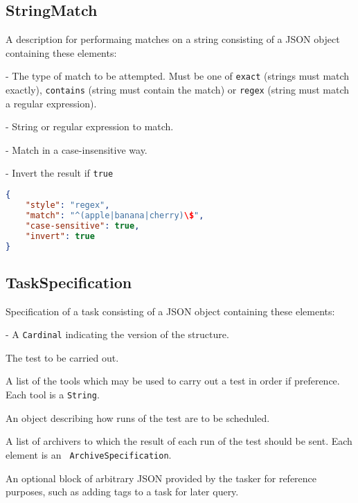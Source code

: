 \documentclass[10pt]{article}
\begin{document}
\subsection{StringMatch}
A description for performaing matches on a string consisting of a JSON
object containing these elements:

 - The type of match to be attempted.  Must
be one of {\tt exact} (strings must match exactly), {\tt contains}
(string must contain the match) or {\tt regex} (string must match a
regular expression).

 - String or regular expression to match.

 - Match in a case-insensitive
way.

 - Invert the result if {\tt true}

\example
\begin{lstlisting}[language=json]
{
    "style": "regex",
    "match": "^(apple|banana|cherry)\$",
    "case-sensitive": true,
    "invert": true
}
\end{lstlisting}



\subsection{TaskSpecification}
Specification of a task consisting of a JSON object containing these
elements:

 - A {\tt Cardinal} indicating the version
of the structure.

 The test to be carried out.

 A list of the tools which may be used to
carry out a test in order if preference.  Each tool is a {\tt String}.

 An object describing how
runs of the test are to be scheduled.

 A list of archivers to which the result of
each run of the test should be sent.  Each element is an {\tt
  ArchiveSpecification}.

 An optional block of arbitrary JSON
provided by the tasker for reference purposes, such as adding tags to
a task for later query.
\end{document}
